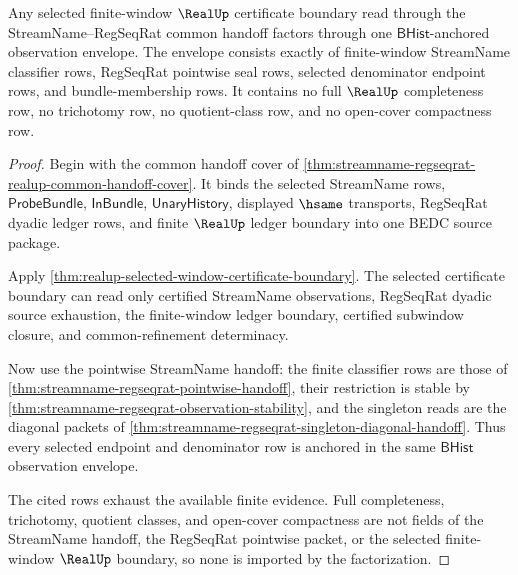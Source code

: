 \begin{theorem}
\label{thm:realup-streamname-regular-observation-envelope}
Any selected finite-window $\RealUp$ certificate boundary read through the
StreamName--RegSeqRat common handoff factors through one
$\mathsf{BHist}$-anchored observation envelope. The envelope consists exactly
of finite-window StreamName classifier rows, RegSeqRat pointwise seal rows,
selected denominator endpoint rows, and bundle-membership rows. It contains no
full $\RealUp$ completeness row, no trichotomy row, no quotient-class row, and
no open-cover compactness row.
\end{theorem}
\begin{proof}
Begin with the common handoff cover of
\autoref{thm:streamname-regseqrat-realup-common-handoff-cover}. It binds the
selected StreamName rows, $\mathsf{ProbeBundle}$, $\mathsf{InBundle}$,
$\mathsf{UnaryHistory}$, displayed $\hsame$ transports, RegSeqRat dyadic ledger
rows, and finite $\RealUp$ ledger boundary into one BEDC source package.

Apply \autoref{thm:realup-selected-window-certificate-boundary}. The selected
certificate boundary can read only certified StreamName observations,
RegSeqRat dyadic source exhaustion, the finite-window ledger boundary,
certified subwindow closure, and common-refinement determinacy.

Now use the pointwise StreamName handoff: the finite classifier rows are those
of \autoref{thm:streamname-regseqrat-pointwise-handoff}, their restriction is
stable by \autoref{thm:streamname-regseqrat-observation-stability}, and the
singleton reads are the diagonal packets of
\autoref{thm:streamname-regseqrat-singleton-diagonal-handoff}. Thus every
selected endpoint and denominator row is anchored in the same
$\mathsf{BHist}$ observation envelope.

The cited rows exhaust the available finite evidence. Full completeness,
trichotomy, quotient classes, and open-cover compactness are not fields of the
StreamName handoff, the RegSeqRat pointwise packet, or the selected
finite-window $\RealUp$ boundary, so none is imported by the factorization.
\end{proof}

